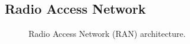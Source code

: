 \documentclass[12pt,a4paper]{report}
\begin{document}
	\subsection{Radio Access Network}
	
	
	\begin{figure}[H]
		\centering
		\fbox{\rule{0pt}{3in}\rule{0.85\textwidth}{0pt}}
		\caption{Radio Access Network (RAN) architecture.}
		\label{fig:ran}
	\end{figure}

\end{document}
